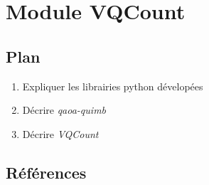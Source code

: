 

\section{Module VQCount}

\subsection*{Plan}

\begin{enumerate}
    \item Expliquer les librairies python dévelopées
    \item Décrire \textit{qaoa-quimb}
    \item Décrire \textit{VQCount}
\end{enumerate}

\subsection*{Références}